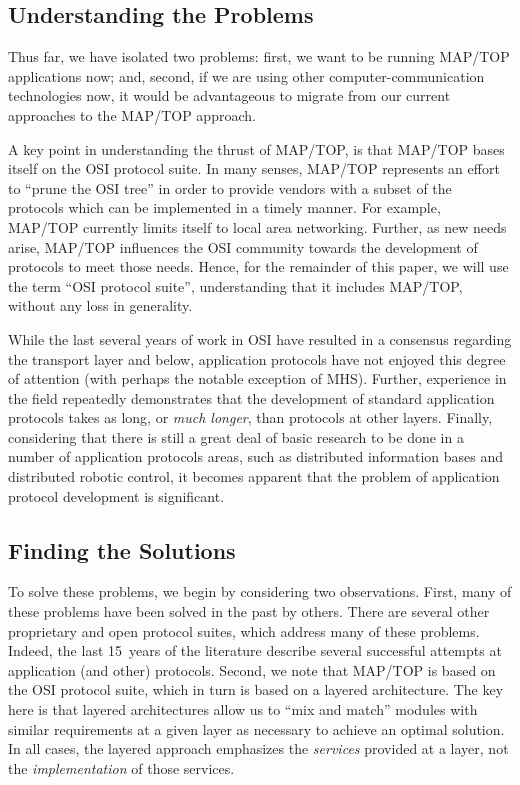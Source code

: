 \subsection	{Understanding the Problems}
Thus far,
we have isolated two problems:
first, we want to be running MAP/TOP applications now;
and,
second, if we are using other computer-communication technologies now,
it would be advantageous to migrate from our current approaches to the
MAP/TOP approach.

A key point in understanding the thrust of MAP/TOP,
is that MAP/TOP bases itself on the OSI protocol suite.
In many senses,
MAP/TOP represents an effort to ``prune the OSI tree'' in order to provide
vendors with a subset of the protocols which can be implemented in a timely
manner.
For example,
MAP/TOP currently limits itself to local area networking.
Further,
as new needs arise,
MAP/TOP influences the OSI community towards the development of protocols to
meet those needs.
Hence,
for the remainder of this paper,
we will use the term ``OSI protocol suite'',
understanding that it includes MAP/TOP,
without any loss in generality.

While the last several years of work in OSI have resulted in a
consensus regarding the transport layer and below,
application protocols have not enjoyed this degree of attention
(with perhaps the notable exception of MHS\cite{MHS}).
Further,
experience in the field repeatedly demonstrates that the development of
standard application protocols takes as long, or {\em much longer},
than protocols at other layers.
Finally,
considering that there is still a great deal of basic research to be
done in a number of application protocols areas,
such as distributed information bases and distributed robotic control,
it becomes apparent that the problem of application protocol development
is significant.

\subsection	{Finding the Solutions}
To solve these problems,
we begin by considering two observations.
First,
many of these problems have been solved in the past by others.
There are several other proprietary and open protocol suites,
which address many of these problems.
Indeed,
the last 15~years of the literature describe several successful attempts
at application (and other) protocols.
Second,
we note that MAP/TOP is based on the OSI protocol suite,
which in turn is based on a layered architecture.
The key here is that layered architectures allow us to
``mix and match'' modules with similar requirements at a given layer as
necessary to achieve an optimal solution.
In all cases,
the layered approach emphasizes the {\em services\/} provided at a layer,
not the {\em implementation\/} of those services.

